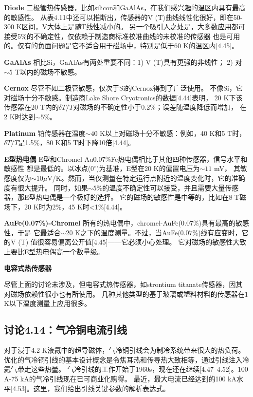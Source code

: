\textbf{Diode} 二极管热传感器，比如silicon和GaAlAs，在我们感兴趣的温区内具有最高的敏感性。
从表4.11中还可以推断出，传感器的V (T)曲线线性化很好，即在50-300 K区间，V大体上是随T线性减小的。
另一个吸引人之处是，大多数应用都可接受5\%的不确定性，仅依赖于制造商标准校准曲线的未校准的传感器
也是可用的。仅有的负面问题是它不适合用于磁场中，特别是低于60 K的温区内[4.45]。

\textbf{GaAlAs} 相比Si，GaAlAs有两处重要不同：1) V (T)具有更强的非线性；
2) 对$\sim 5$ T以内的磁场不敏感。

\textbf{Cernox} 尽管不如二极管敏感，仅次于Si的Cernox得到了广泛使用。
不像Si，它对磁场十分不敏感。制造商Lake Shore Cryotronics的数据[4.44]表明，
20 K下该传感器在20 T内的$\delta T/T$对磁场的不确定性小于0.2\%；误差随温度降低而增加，
在2 K时达到$\sim 5$\%。

\textbf{Platinum} 铂传感器在温度$\sim 40$ K以上对磁场十分不敏感：例如，40 K和5 T时，
$\delta T/T$是1.5\%，80 K和5 T时下降10倍[4.44]。

\textbf{E型热电偶} E型和Chromel-Au0.07\%Fe热电偶相比于其他四种传感器，信号水平和敏感性
都是最低的。以冰点($0^\circ$)为基准，E型在20 K的偏置电压为$\sim 11$ mV，
其敏感度仅为$\sim 10\mu$V/K。然而，当仅测量在特定运行点附近的温度变化时，它的准确度有很大提升。
同时，如果$\sim 5$\%的温度不确定性可以接受，并且需要大量传感器，那E型热电偶是一个极好的选择。
它的磁场的敏感性是中等的，比如在8 T磁场下，20 K时为2\%，45 K时<1\%[4.44]。

\textbf{AuFe(0.07\%)-Chromel} 所有的热电偶中，chromel-AuFe(0.07\%)具有最高的敏感性，于是
它最适合$\sim 20$ K之下的温度测量。不过，当AuFe(0.07\%)线有应变时，它的V (T) 值很容易偏离公开值[4.45]——它必须小心处理。
它对磁场的敏感性大致上要比E型热电偶高一个数量级。

\textbf{电容式热传感器}

尽管上面的讨论未涉及，但电容式热传感器，如strontium titanate传感器，因其对磁场依赖性很小也有所使用。
几种其他类型的基于玻璃或塑料材料的传感器在1 K以下温度测量上应用很多。

\subsection{讨论4.14：气冷铜电流引线}
对于浸于4.2 K液氦中的超导磁体，气冷铜引线会为制冷系统带来很大的热负荷。
优化的气冷铜引线的基本设计概念是令焦耳热和传导热大致相等，通过引线注入冷氦气带走这些热量。
气冷引线的工作开始于1960s，现在还在继续[4.47–4.52]。100 A-75 kA的气冷引线现在已可商业化购得。
最近，最大电流已经达到的100 kA水平[4.53]。这里，我们给出引线关键参数的解析表达式。

